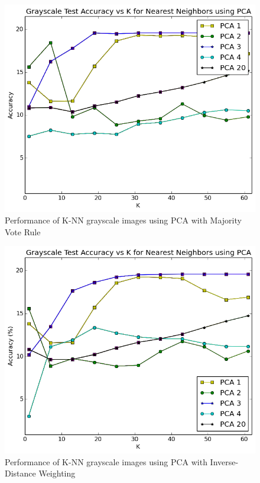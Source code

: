 \documentclass{article} %
\begin{document}
\begin{figure}
\centering
	\includegraphics[width=0.8\linewidth]{./plots/knn/majorityvote}
    	\caption{Performance of K-NN grayscale images using PCA with Majority Vote Rule}
	\label{fig:knn_vote}
\end{figure}

\begin{figure}
\centering
	\includegraphics[width=0.8\linewidth]{./plots/knn/weighted}
    	\caption{Performance of K-NN grayscale images using PCA with Inverse-Distance Weighting}
	\label{fig:knn_weighted}
\end{figure}
\end{document}
